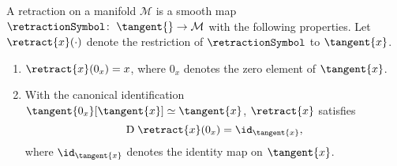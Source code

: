 \begin{definition}\label{Retraction}
    A retraction on a manifold $\mathcal{M}$ is a smooth map $\retractionSymbol \colon \; \tangent{} \to \mathcal{M}$ with the following properties. Let $\retract{x}(\cdot)$ denote the restriction of $\retractionSymbol$ to $\tangent{x}$. 
    \begin{enumerate}
        \item $\retract{x}(0_x) = x$, where $0_x$ denotes the zero element of $\tangent{x}$. 
        \item With the canonical identification $\tangent{0_x}[\tangent{x}] \simeq \tangent{x}$, $\retract{x}$ satisfies \begin{equation} \mathrm{D} \; \retract{x}(0_x) = \id_{\tangent{x}}, \label{LocalRigidity} \end{equation} where $\id_{\tangent{x}}$ denotes the identity map on $\tangent{x}$.  
    \end{enumerate}
\end{definition}

